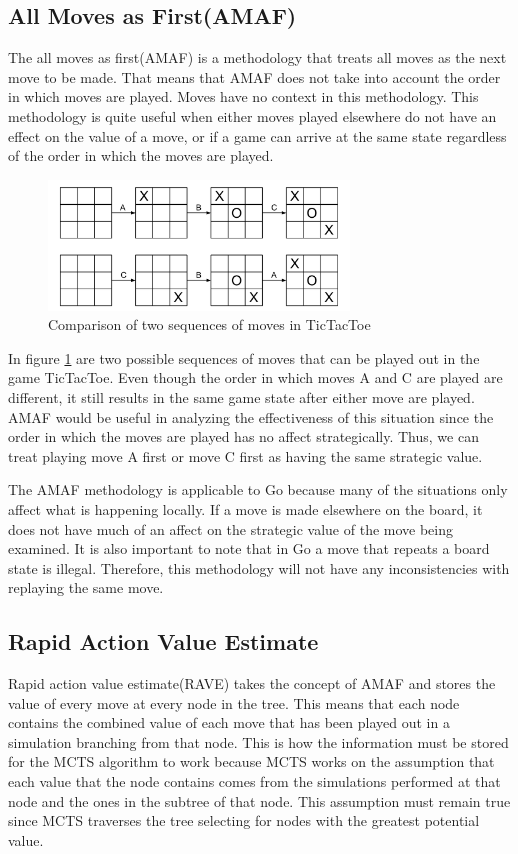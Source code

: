 \documentclass{sig-alternate}
\begin{document}
\subsection{All Moves as First(AMAF)}
The all moves as first(AMAF) is a methodology that treats all moves as the next move to be made. That means that AMAF does not take into account the order in which moves are played. Moves have no context in this methodology. This methodology is quite useful when either moves played elsewhere do not have an effect on the value of a move, or if a game can arrive at the same state regardless of the order in which the moves are played.

\begin{figure}[h]
	\includegraphics[width=8cm]{MoveOrderNotMattering.pdf}
	\centering
	\caption{Comparison of two sequences of moves in TicTacToe}
	\label{fig:TwoSeq}
\end{figure}

In figure \ref{fig:TwoSeq} are two possible sequences of moves that can be played out in the game TicTacToe. Even though the order in which moves A and C are played are different, it still results in the same game state after either move are played. AMAF would be useful in analyzing the effectiveness of this situation since the order in which the moves are played has no affect strategically. Thus, we can treat playing move A first or move C first as having the same strategic value.

The AMAF methodology is applicable to Go because many of the situations only affect what is happening locally. If a move is made elsewhere on the board, it does not have much of an affect on the strategic value of the move being examined. It is also important to note that in Go a move that repeats a board state is illegal. Therefore, this methodology will not have any inconsistencies with replaying the same move.

\subsection{Rapid Action Value Estimate}
Rapid action value estimate(RAVE) takes the concept of AMAF and stores the value of every move at every node in the tree. This means that each node contains the combined value of each move that has been played out in a simulation branching from that node. This is how the information must be stored for the MCTS algorithm to work because MCTS works on the assumption that each value that the node contains comes from the simulations performed at that node and the ones in the subtree of that node. This assumption must remain true since MCTS traverses the tree selecting for nodes with the greatest potential value.
\end{document}
